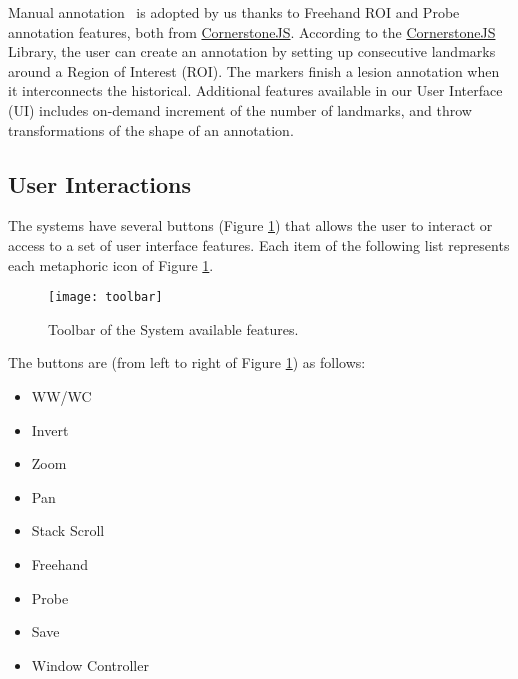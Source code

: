 \hfill


Manual annotation~ is adopted by us thanks to Freehand ROI and Probe annotation features, both from \hyperlink{https://cornerstonejs.org/}{CornerstoneJS}. According to the \hyperlink{https://cornerstonejs.org/}{CornerstoneJS} Library, the user can create an annotation by setting up consecutive landmarks around a Region of Interest (ROI). The markers finish a lesion annotation when it interconnects the historical. Additional features available in our User Interface (UI) includes on-demand increment of the number of landmarks, and throw transformations of the shape of an annotation.

\clearpage


\subsection{User Interactions}

The systems have several buttons (Figure \ref{fig:toolbar}) that allows the user to interact or access to a set of user interface features. Each item of the following list represents each metaphoric icon of Figure \ref{fig:toolbar}.


\hfill

\begin{figure}[h]
\centering
\texttt{[image: toolbar]}
\caption{Toolbar of the System available features.}
\label{fig:toolbar}
\end{figure}

\hfill


\hfill

The buttons are (from left to right of Figure \ref{fig:toolbar}) as follows:

\hfill

\begin{itemize}
\item WW/WC
\item Invert
\item Zoom
\item Pan
\item Stack Scroll
\item Freehand
\item Probe
\item Save
\item Window Controller
\end{itemize}


